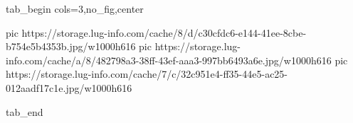  
 
 
 
 


\ifcmt
  tab_begin cols=3,no_fig,center

     pic https://storage.lug-info.com/cache/8/d/c30cfdc6-e144-41ee-8cbe-b754e5b4353b.jpg/w1000h616%
		 pic https://storage.lug-info.com/cache/a/8/482798a3-38ff-43ef-aaa3-997bb6493a6e.jpg/w1000h616%
		 pic https://storage.lug-info.com/cache/7/c/32c951e4-ff35-44e5-ac25-012aadf17c1e.jpg/w1000h616%

  tab_end
\fi

